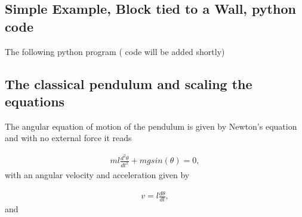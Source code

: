 \documentclass[letterpaper,10pt,english]{sphinxmanual}
\begin{document}
\subsection{Simple Example, Block tied to a Wall, python code}
\label{\detokenize{chapter2:simple-example-block-tied-to-a-wall-python-code}}
The following python program ( code will be added shortly)

\begin{sphinxVerbatim}[commandchars=\\\{\}]
\PYG{c+c1}{\PYGZsh{} t \PYGZbs{}in [0, 4\PYGZbs{}pi) (two periods)}
\end{sphinxVerbatim}


\subsection{The classical pendulum and scaling the equations}
\label{\detokenize{chapter2:the-classical-pendulum-and-scaling-the-equations}}
The angular equation of motion of the pendulum is given by
Newton’s equation and with no external force it reads




\begin{equation*}
\begin{split}
\begin{equation}
  ml\frac{d^2\theta}{dt^2}+mgsin(\theta)=0,
\label{_auto19} \tag{20}
\end{equation}
\end{split}
\end{equation*}
with an angular velocity and acceleration given by




\begin{equation*}
\begin{split}
\begin{equation}
     v=l\frac{d\theta}{dt},
\label{_auto20} \tag{21}
\end{equation}
\end{split}
\end{equation*}
and
\end{document}
